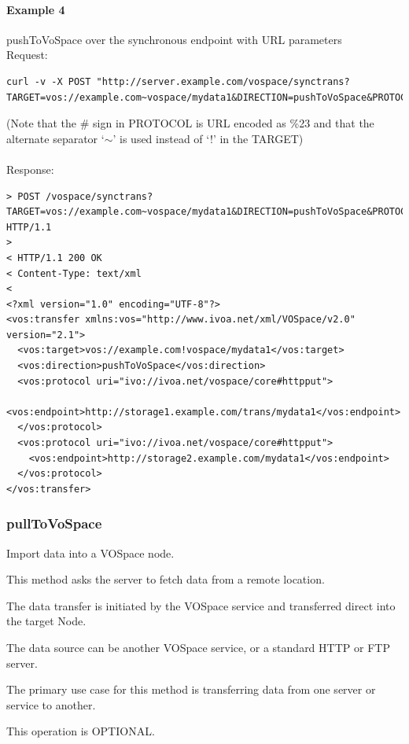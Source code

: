 \documentclass[11pt,a4paper]{ivoa}
\begin{document}
\paragraph{Example 4}
pushToVoSpace over the synchronous endpoint with URL parameters
\\[5px]
\noindent
Request:
\begin{lstlisting}
curl -v -X POST "http://server.example.com/vospace/synctrans?TARGET=vos://example.com~vospace/mydata1&DIRECTION=pushToVoSpace&PROTOCOL=ivo://ivoa.net/vospace/core%23httpput"
\end{lstlisting}
(Note that the \# sign in PROTOCOL is URL encoded as \%23 and that the alternate separator `$\mathtt{\sim}$' is used instead of `!' in the TARGET) \\
\\
Response:
\begin{lstlisting}
> POST /vospace/synctrans?TARGET=vos://example.com~vospace/mydata1&DIRECTION=pushToVoSpace&PROTOCOL=ivo://ivoa.net/vospace/core\%23httpput HTTP/1.1
>
< HTTP/1.1 200 OK
< Content-Type: text/xml
<
<?xml version="1.0" encoding="UTF-8"?>
<vos:transfer xmlns:vos="http://www.ivoa.net/xml/VOSpace/v2.0" version="2.1">
  <vos:target>vos://example.com!vospace/mydata1</vos:target>
  <vos:direction>pushToVoSpace</vos:direction>
  <vos:protocol uri="ivo://ivoa.net/vospace/core#httpput">
    <vos:endpoint>http://storage1.example.com/trans/mydata1</vos:endpoint>
  </vos:protocol>
  <vos:protocol uri="ivo://ivoa.net/vospace/core#httpput">
    <vos:endpoint>http://storage2.example.com/mydata1</vos:endpoint>
  </vos:protocol>
</vos:transfer>
\end{lstlisting}

\subsubsection{pullToVoSpace}
\label{subsubsec:pulltovospace}
Import data into a VOSpace node.

This method asks the server to fetch data from a remote location.

The data transfer is initiated by the VOSpace service and transferred direct into the target Node.

The data source can be another VOSpace service, or a standard HTTP or FTP server.

The primary use case for this method is transferring data from one server or service to another.

This operation is OPTIONAL.
\end{document}

